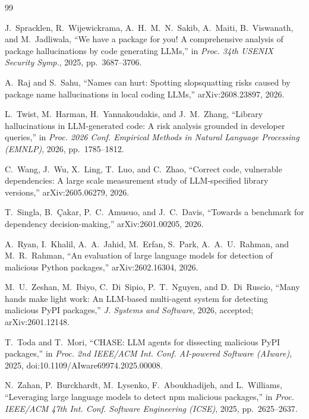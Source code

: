 \documentclass[conference]{IEEEtran}
\begin{document}
\begin{thebibliography}{99}

J.~Spracklen, R.~Wijewickrama, A.~H.~M.~N.~Sakib, A.~Maiti, B.~Viswanath, and M.~Jadliwala,
``We have a package for you! A comprehensive analysis of package hallucinations by code generating LLMs,''
in \emph{Proc. 34th USENIX Security Symp.}, 2025, pp.~3687--3706.

A.~Raj and S.~Sahu,
``Names can hurt: Spotting slopsquatting risks caused by package name hallucinations in local coding LLMs,''
arXiv:2608.23897, 2026.

L.~Twist, M.~Harman, H.~Yannakoudakis, and J.~M.~Zhang,
``Library hallucinations in LLM-generated code: A risk analysis grounded in developer queries,''
in \emph{Proc. 2026 Conf. Empirical Methods in Natural Language Processing (EMNLP)}, 2026, pp.~1785--1812.

C.~Wang, J.~Wu, X.~Ling, T.~Luo, and C.~Zhao,
``Correct code, vulnerable dependencies: A large scale measurement study of LLM-specified library versions,''
arXiv:2605.06279, 2026.

T.~Singla, B.~{\c{C}}akar, P.~C.~Amusuo, and J.~C.~Davis,
``Towards a benchmark for dependency decision-making,'' arXiv:2601.00205, 2026.

A.~Ryan, I.~Khalil, A.~A.~Jahid, M.~Erfan, S.~Park, A.~A.~U.~Rahman, and M.~R.~Rahman,
``An evaluation of large language models for detection of malicious Python packages,'' arXiv:2602.16304, 2026.

M.~U.~Zeshan, M.~Ibiyo, C.~Di~Sipio, P.~T.~Nguyen, and D.~Di~Ruscio,
``Many hands make light work: An LLM-based multi-agent system for detecting malicious PyPI packages,''
\emph{J. Systems and Software}, 2026, accepted; arXiv:2601.12148.

T.~Toda and T.~Mori, ``CHASE: LLM agents for dissecting malicious PyPI packages,'' in \emph{Proc. 2nd IEEE/ACM
Int. Conf. AI-powered Software (AIware)}, 2025, doi:10.1109/AIware69974.2025.00008.

N.~Zahan, P.~Burckhardt, M.~Lysenko, F.~Aboukhadijeh, and L.~Williams,
``Leveraging large language models to detect npm malicious packages,''
in \emph{Proc. IEEE/ACM 47th Int. Conf. Software Engineering (ICSE)}, 2025, pp.~2625--2637.


\end{thebibliography}
\end{document}
